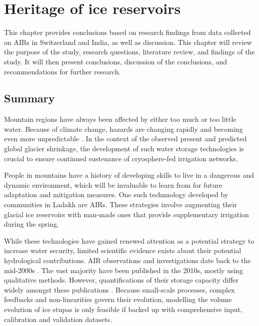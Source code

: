 \chapter{Heritage of ice reservoirs}


This chapter provides conclusions based on research findings from data collected on AIRs in Switzerland and
India, as well as discussion. This chapter will review the purpose of the study, research questions, literature
review, and findings of the study. It will then present conclusions, discussion of the conclusions, and
recommendations for further research.

\section{Summary}

Mountain regions have always been affected by either too much or too little water. Because of climate change,
hazards are changing rapidly and becoming even more unpredictable \citep{ipccCrossChapterPaperMountains2022}. In
the context of the observed present and predicted global glacier shrinkage, the development of such water
storage technologies is crucial to ensure continued sustenance of cryosphere-fed irrigation networks.

People in mountains have a history of developing skills to live in a dangerous and dynamic environment, which
will be invaluable to learn from for future adaptation and mitigation measures. One such technnology developed
by communities in Ladakh are \ac{AIRs}. These strategies involve augmenting their glacial ice reservoirs with
man-made ones that provide supplementary irrigation during the spring.

While these technologies have gained renewed attention as a potential strategy to increase water security,
limited scientific evidence exists about their potential hydrological contributions. AIR observations and
investigations date back to the mid-2000s \citep{tveitenGlacierGrowingLocal2007}. The vast majority have been
published in the 2010s, mostly using qualitative methods. However, quantifications of their storage capacity
differ widely amongst these publications \citep{baglaArtificialGlaciersHelp1998, norphelSnowWaterHarvesting2015,
	nusserSociohydrologyArtificialGlaciers2019}. Because small-scale processes, complex feedbacks and
non-linearities govern their evolution, modelling the volume evolution of ice stupas is only feasible if backed
up with comprehensive input, calibration and validation datasets.

